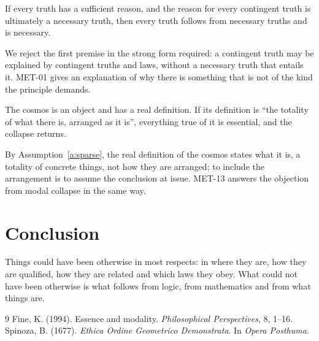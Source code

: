 \documentclass{situationist-preprint}
\begin{document}
\begin{objection}
If every truth has a sufficient reason, and the reason for every contingent truth is ultimately a necessary truth, then every truth follows from necessary truths and is necessary.
\end{objection}

\begin{reply}
We reject the first premise in the strong form required: a contingent truth may be explained by contingent truths and laws, without a necessary truth that entails it. MET-01 gives an explanation of why there is something that is not of the kind the principle demands.
\end{reply}

\begin{objection}
The cosmos is an object and has a real definition. If its definition is \enquote{the totality of what there is, arranged as it is}, everything true of it is essential, and the collapse returns.
\end{objection}

\begin{reply}
By Assumption~\ref{a:sparse}, the real definition of the cosmos states what it is, a totality of concrete things, not how they are arranged; to include the arrangement is to assume the conclusion at issue. MET-13 answers the objection from modal collapse in the same way.
\end{reply}

\section{Conclusion}

Things could have been otherwise in most respects: in where they are, how they are qualified, how they are related and which laws they obey. What could not have been otherwise is what follows from logic, from mathematics and from what things are.

\begin{thebibliography}{9}\small
{} Fine, K. (1994). Essence and modality. \emph{Philosophical Perspectives}, 8, 1--16.
 Spinoza, B. (1677). \emph{Ethica Ordine Geometrico Demonstrata}. In \emph{Opera Posthuma}.
\end{thebibliography}
\end{document}
